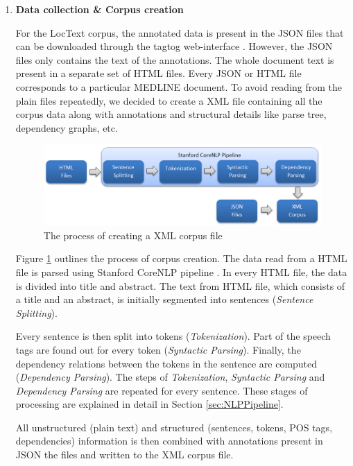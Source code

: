 \begin{enumerate}

\item \textbf{Data collection \& Corpus creation}

For the LocText corpus, the annotated data is present in the JSON files that can be downloaded through the tagtog web-interface \cite{cejuela2014tagtog}. However, the JSON files only contains the text of the annotations. The whole document text is present in a separate set of HTML files. Every JSON or HTML file corresponds to a particular MEDLINE \cite{medline} document. To avoid reading from the plain files repeatedly, we decided to create a XML file containing all the corpus data along with annotations and structural details like parse tree, dependency graphs, etc.

\begin{figure}
\centering
\includegraphics[scale=0.58]{figures/Corpus_Creation.png}
\caption{The process of creating a XML corpus file}\label{fig:corpusCreation}
\end{figure}

Figure \ref{fig:corpusCreation} outlines the process  of corpus creation. The data read from a HTML file is parsed using Stanford CoreNLP pipeline \cite{manning2014stanford}. In every HTML file, the data is divided into title and abstract. The text from HTML file, which consists of a title and an abstract, is initially segmented into sentences (\textit{Sentence Splitting}). 

Every sentence is then split into tokens (\textit{Tokenization}). Part of the speech tags are found out for every token (\textit{Syntactic Parsing}). Finally, the dependency relations between the tokens in the sentence are computed (\textit{Dependency Parsing}). The steps of \textit{Tokenization}, \textit{Syntactic Parsing} and \textit{Dependency Parsing} are repeated for every sentence. These stages of processing are explained in detail in Section \ref{sec:NLPPipeline}.

All unstructured (plain text) and structured (sentences, tokens, POS tags, dependencies) information is then combined with annotations present in JSON the files and written to the XML corpus file.


\end{enumerate}
